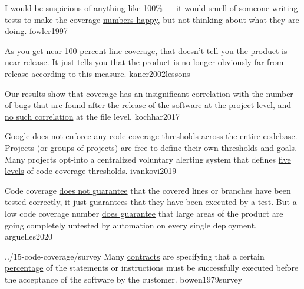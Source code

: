 \documentclass{article}
\begin{document}
  {I would be suspicious of anything like 100\% --- it would smell of someone writing tests to make the coverage \ul{numbers happy}, but not thinking about what they are doing.}
  {fowler1997}

  {As you get near 100 percent line coverage, that doesn't tell you the product is near release. It just tells you that the product is no longer \ul{obviously far} from release according to \ul{this measure}.}
  {kaner2002lessons}

  {Our results show that coverage has an \ul{insignificant correlation} with the number of bugs that are found after the release of the software at the project level, and \ul{no such correlation} at the file level.}
  {kochhar2017}

  {Google \ul{does not enforce} any code coverage thresholds across the entire codebase. Projects (or groups of projects) are free to define their own thresholds and goals. Many projects opt-into a centralized voluntary alerting system that defines \ul{five levels} of code coverage thresholds.}
  {ivankovi2019}


  {Code coverage \ul{does not guarantee} that the covered lines or branches have been tested correctly, it just guarantees that they have been executed by a test. But a low code coverage number \ul{does guarantee} that large areas of the product are going completely untested by automation on every single deployment.}
  {arguelles2020}

\lnQuote
  {../15-code-coverage/survey}
  {Many \ul{contracts} are specifying that a certain \ul{percentage} of the statements or instructions must be successfully executed before the acceptance of the software by the customer.}
  {bowen1979survey}
\end{document}
